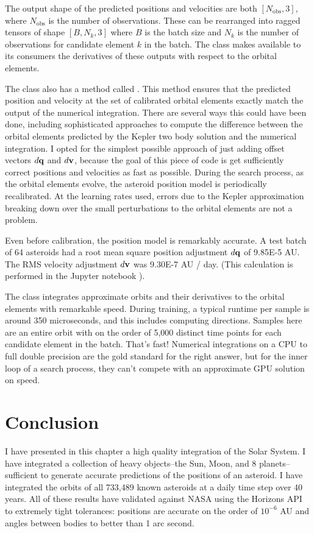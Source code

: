 The output shape of the predicted positions and velocities are both $[N_{\mathrm{obs}}, 3]$, where $N_{\mathrm{obs}}$ is the number of observations.
These can be rearranged into ragged tensors of shape $[B, N_{k}, 3]$ where $B$ is the batch size and $N_{k}$ is the number of observations for 
candidate element $k$ in the batch.
The class makes available to its consumers the derivatives of these outputs with respect to the orbital elements.

The  class also has a method called .
This method ensures that the predicted position and velocity at the set of calibrated orbital elements exactly match the output of the numerical integration.
There are several ways this could have been done, including sophisticated approaches to compute 
the difference between the orbital elements predicted by the Kepler two body solution and the numerical integration.
I opted for the simplest possible approach of just adding offset vectors $d \mathbf{q}$ and $d \mathbf{v}$,
because the goal of this piece of code is get sufficiently correct positions and velocities as fast as possible.
During the search process, as the orbital elements evolve, the asteroid position model is periodically recalibrated.
At the learning rates used, errors due to the Kepler approximation breaking down over the small perturbations to the orbital elements are not a problem.

Even before calibration, the position model is remarkably accurate.
A test batch of 64 asteroids had a root mean square position adjustment $d \mathbf{q}$ of 9.85E-5 AU.
The RMS velocity adjustment $d \mathbf{v}$ was 9.30E-7 AU / day.
(This calculation is performed in the Jupyter notebook ).

The  class integrates approximate orbits and their derivatives to the orbital elements with remarkable speed.
During training, a typical runtime per sample is around 350 microseconds, and this includes computing directions.
Samples here are an entire orbit with on the order of 5,000 distinct time points for each candidate element in the batch.
That's fast! 
Numerical integrations on a CPU to full double precision are the gold standard for the right answer, 
but for the inner loop of a search process, they can't compete with an approximate GPU solution on speed.

\section{Conclusion}
\label{section_conclusion}
I have presented in this chapter a high quality integration of the Solar System.
I have integrated a collection of heavy objects--the Sun, Moon, and 8 planets--sufficient to generate accurate predictions of the positions of an asteroid.
I have integrated the orbits of all 733,489 known asteroids at a daily time step over 40 years.
All of these results have validated against NASA using the Horizons API to extremely tight tolerances:
positions are accurate on the order of $10^{-6}$ AU and angles between bodies to better than 1 arc second.


